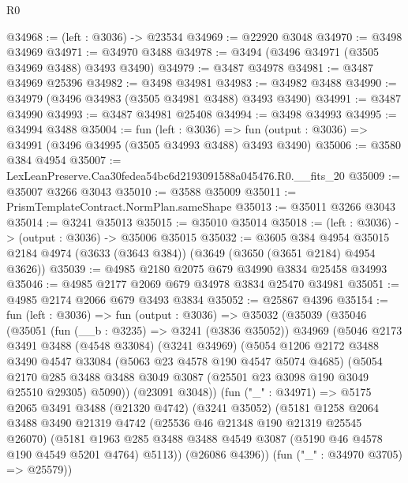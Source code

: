 \begin{lexlean}{R0}
\begin{coremodule}
@34968 := (left : @3036) -> @23534
@34969 := @22920 @3048
@34970 := @3498 @34969
@34971 := @34970 @3488
@34978 := @3494 (@3496 @34971 (@3505 @34969 @3488) @3493 @3490)
@34979 := @3487 @34978
@34981 := @3487 @34969 @25396
@34982 := @3498 @34981
@34983 := @34982 @3488
@34990 := @34979 (@3496 @34983 (@3505 @34981 @3488) @3493 @3490)
@34991 := @3487 @34990
@34993 := @3487 @34981 @25408
@34994 := @3498 @34993
@34995 := @34994 @3488
@35004 := fun (left : @3036) =>
  fun (output : @3036) => @34991 (@3496 @34995 (@3505 @34993 @3488) @3493 @3490)
@35006 := @3580 @384 @4954
@35007 := LexLeanPreserve.Caa30fedea54bc6d2193091588a045476.R0.__fits_20
@35009 := @35007 @3266 @3043
@35010 := @3588 @35009
@35011 := PrismTemplateContract.NormPlan.sameShape
@35013 := @35011 @3266 @3043
@35014 := @3241 @35013
@35015 := @35010 @35014
@35018 := (left : @3036) -> (output : @3036) -> @35006 @35015
@35032 := @3605
    @384
    @4954
    @35015
    @2184
    @4974
    (@3633 (@3643 @384))
    (@3649 (@3650 (@3651 @2184) @4954 @3626))
@35039 := @4985 @2180 @2075 @679 @34990 @3834 @25458 @34993
@35046 := @4985 @2177 @2069 @679 @34978 @3834 @25470 @34981
@35051 := @4985 @2174 @2066 @679 @3493 @3834
@35052 := @25867 @4396
@35154 := fun (left : @3036) =>
  fun (output : @3036) =>
  @35032
    (@35039
      (@35046
        (@35051
          (fun (__b : @3235) => @3241 (@3836 @35052))
          @34969
          (@5046
            @2173
            @3491
            @3488
            (@4548 @33084)
            (@3241 @34969)
            (@5054
              @1206
              @2172
              @3488
              @3490
              @4547
              @33084
              (@5063 @23 @4578 @190 @4547 @5074 @4685)
              (@5054
                @2170
                @285
                @3488
                @3488
                @3049
                @3087
                (@25501 @23 @3098 @190 @3049 @25510 @29305)
                @5090))
            (@23091 @3048))
          (fun ("_" : @34971) =>
          @5175
            @2065
            @3491
            @3488
            (@21320 @4742)
            (@3241 @35052)
            (@5181
              @1258
              @2064
              @3488
              @3490
              @21319
              @4742
              (@25536 @46 @21348 @190 @21319 @25545 @26070)
              (@5181
                @1963
                @285
                @3488
                @3488
                @4549
                @3087
                (@5190 @46 @4578 @190 @4549 @5201 @4764)
                @5113))
            (@26086 @4396))
          (fun ("_" : @34970 @3705) => @25579))

\end{coremodule}
\end{lexlean}
